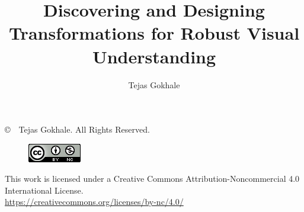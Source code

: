 \documentclass[12pt,letterpaper]{report}
\begin{document}
\title{Discovering and Designing Transformations for Robust Visual Understanding}
\author{Tejas Gokhale}
\maketitle
\doublespace

\newpage
\vspace*{\fill}
\noindent 
\copyright~~Tejas Gokhale. All Rights Reserved.\\

\begin{figure}
    \includegraphics[width=\linewidth]{figures/cc_by_nc.png}
\end{figure}
\noindent This work is licensed under a Creative Commons Attribution-Noncommercial 4.0 International License.\\
\url{https://creativecommons.org/licenses/by-nc/4.0/}
\end{document}
